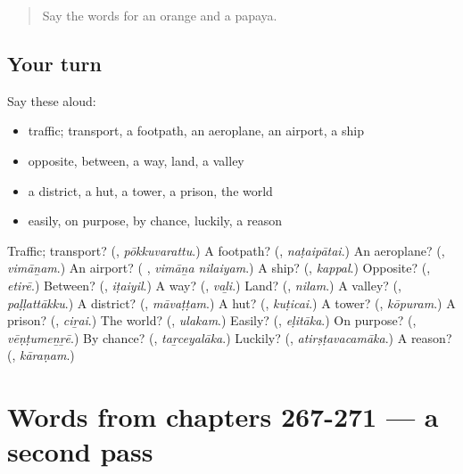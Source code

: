 \label{lesson:TA-R271-first-pass-words-from-chapters-263-266}



\begin{quote}
Say the words for an orange and a papaya.
\end{quote}

\subsection*{Your turn}
Say these aloud:

\begin{itemize}
\raggedright
  \item traffic; transport, a footpath, an aeroplane, an airport, a ship
  \item opposite, between, a way, land, a valley
  \item a district, a hut, a tower, a prison, the world
  \item easily, on purpose, by chance, luckily, a reason
\end{itemize}

\begin{tcolorbox}[breakable,colback=teal!4,colframe=teal!35!black,title={Before you move on}]
Traffic; transport? (\textbf{}, \emph{pōkkuvarattu}.) A footpath? (\textbf{}, \emph{naṭaipātai}.) An aeroplane? (\textbf{}, \emph{vimāṉam}.) An airport? (\textbf{ }, \emph{vimāṉa nilaiyam}.) A ship? (\textbf{}, \emph{kappal}.) Opposite? (\textbf{}, \emph{etirē}.) Between? (\textbf{}, \emph{iṭaiyil}.) A way? (\textbf{}, \emph{vaḻi}.) Land? (\textbf{}, \emph{nilam}.) A valley? (\textbf{}, \emph{paḷḷattākku}.) A district? (\textbf{}, \emph{māvaṭṭam}.) A hut? (\textbf{}, \emph{kuṭicai}.) A tower? (\textbf{}, \emph{kōpuram}.) A prison? (\textbf{}, \emph{ciṟai}.) The world? (\textbf{}, \emph{ulakam}.) Easily? (\textbf{}, \emph{eḷitāka}.) On purpose? (\textbf{}, \emph{vēṇṭumeṉṟē}.) By chance? (\textbf{}, \emph{taṟceyalāka}.) Luckily? (\textbf{}, \emph{atirṣṭavacamāka}.) A reason? (\textbf{}, \emph{kāraṇam}.)
\end{tcolorbox}
\section[(dialogue)]{Words from chapters 267-271 — a second pass}

